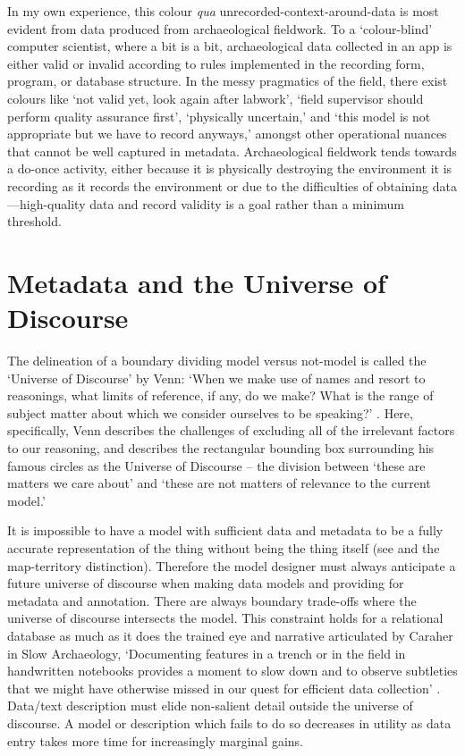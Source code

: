\documentclass{scrarticle}
\begin{document}
In my own experience, this colour \textit{qua} unrecorded-context-around-data is most evident from data produced from archaeological fieldwork. To a `colour-blind' computer scientist, where a bit is a bit, archaeological data collected in an app is either valid or invalid according to rules implemented in the recording form, program, or database structure. In the messy pragmatics of the field, there exist colours like `not valid yet, look again after labwork', `field supervisor should perform quality assurance first', `physically uncertain,' and `this model is not appropriate but we have to record anyways,' amongst other operational nuances that cannot be well captured in metadata. Archaeological fieldwork tends towards a do-once activity, either because it is physically destroying the environment it is recording as it records the environment or due to the difficulties of obtaining data---high-quality data and record validity is a goal rather than a minimum threshold.

\section{Metadata and the Universe of Discourse}

The delineation of a boundary dividing model versus not-model is called the `Universe of Discourse' by Venn: `When we make use of names and resort to reasonings, what limits of reference, if any, do we make? What is the range of subject matter about which we consider ourselves to be speaking?' \parencite[180]{Venn1881-yy}. Here, specifically, Venn describes the challenges of excluding all of the irrelevant factors to our reasoning, and describes the rectangular bounding box surrounding his famous circles as the Universe of Discourse -- the division between `these are matters we care about' and `these are not matters of relevance to the current model.' 

It is impossible to have a model with sufficient data and metadata to be a fully accurate representation of the thing without being the thing itself (see \cite[131]{Borges1975-rn} and the map-territory distinction). Therefore the model designer must always anticipate a future universe of discourse when making data models and providing for metadata and annotation. There are always boundary trade-offs where the universe of discourse intersects the model. This constraint holds for a relational database as much as it does the trained eye and narrative articulated by Caraher in Slow Archaeology, `Documenting features in a trench or in the field in handwritten notebooks provides a moment to slow down and to observe subtleties that we might have otherwise missed in our quest for efficient data collection' \parencite*[50]{Caraher2015-dn}. Data/text description must elide non-salient detail outside the universe of discourse. A model or description which fails to do so decreases in utility as data entry takes more time for increasingly marginal gains.
\end{document}
